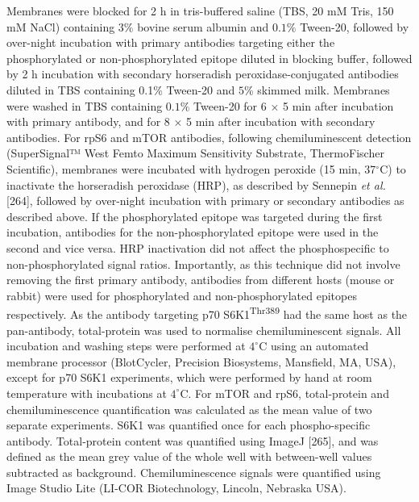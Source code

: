\documentclass[twoside,10pt]{gihclass} %
\begin{document}
Membranes were blocked for 2 h in tris-buffered saline (TBS, 20 mM Tris, 150 mM NaCl) containing \(3\%\) bovine serum albumin and \(0.1\%\) Tween-20, followed by over-night incubation with primary antibodies targeting either the phosphorylated or non-phosphorylated epitope diluted in blocking buffer, followed by 2 h incubation with secondary horseradish peroxidase-conjugated antibodies diluted in TBS containing 0.1\% Tween-20 and \(5\%\) skimmed milk. Membranes were washed in TBS containing \(0.1\%\) Tween-20 for 6 \(\times\) 5 min after incubation with primary antibody, and for 8 \(\times\) 5 min after incubation with secondary antibodies. For rpS6 and mTOR antibodies, following chemiluminescent detection (SuperSignal™ West Femto Maximum Sensitivity Substrate, ThermoFischer Scientific), membranes were incubated with hydrogen peroxide (15 min, 37\(^{\circ}\)C) to inactivate the horseradish peroxidase (HRP), as described by Sennepin \emph{et al.} {[}264{]}, followed by over-night incubation with primary or secondary antibodies as described above. If the phosphorylated epitope was targeted during the first incubation, antibodies for the non-phosphorylated epitope were used in the second and vice versa. HRP inactivation did not affect the phosphospecific to non-phosphorylated signal ratios. Importantly, as this technique did not involve removing the first primary antibody, antibodies from different hosts (mouse or rabbit) were used for phosphorylated and non-phosphorylated epitopes respectively. As the antibody targeting p70 S6K1\textsuperscript{Thr389} had the same host as the pan-antibody, total-protein was used to normalise chemiluminescent signals. All incubation and washing steps were performed at \(4^{\circ}\)C using an automated membrane processor (BlotCycler, Precision Biosystems, Mansfield, MA, USA), except for p70 S6K1 experiments, which were performed by hand at room temperature with incubations at \(4^{\circ}\)C. For mTOR and rpS6, total-protein and chemiluminescence quantification was calculated as the mean value of two separate experiments. S6K1 was quantified once for each phospho-specific antibody. Total-protein content was quantified using ImageJ {[}265{]}, and was defined as the mean grey value of the whole well with between-well values subtracted as background. Chemiluminescence signals were quantified using Image Studio Lite (LI-COR Biotechnology, Lincoln, Nebraska USA).
\end{document}
